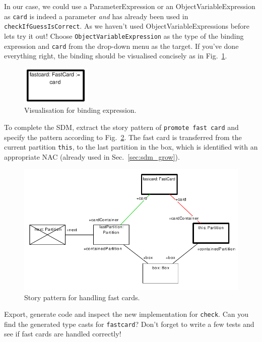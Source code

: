 In our case, we could use a ParameterExpression or an ObjectVariableExpression as
\texttt{card} is indeed a parameter \emph{and} has already been used in
\texttt{checkIfGuessIsCorrect}.  As we haven't used ObjectVariableExpressions
before lets try it out!  Choose \texttt{ObjectVariableExpression} as the type of
the binding expression and \texttt{card} from the drop-down menu as the target. 
If you've done everything right, the binding should be visualised concisely as
in Fig.~\ref{fig:sdm_fastcard_4}.
 
\begin{figure}[htbp]
\begin{center}
  \includegraphics[width=0.3\textwidth]{pics/sdmBilder/bindings/visual_bindingexp}
  \caption{Visualisation for binding expression.}  
  \label{fig:sdm_fastcard_4}
\end{center}
\end{figure}

To complete the SDM, extract the story pattern of \texttt{promote fast card} and
specify the pattern according to Fig.~\ref{fig:sdm_fastcard_5}.  The fast card
is transferred from the current partition \texttt{this}, to the last partition
in the box, which is identified with an appropriate \mbox{NAC} (already used in
Sec.~\ref{sec:sdm_grow}). 

\begin{figure}[htbp]
\begin{center}
  \includegraphics[width=\textwidth]{pics/sdmBilder/bindings/promoteFastCard}
  \caption{Story pattern for handling fast cards.}  
  \label{fig:sdm_fastcard_5}
\end{center}
\end{figure}

Export, generate code and inspect the new implementation for \texttt{check}. 
Can you find the generated type casts for \texttt{fastcard}?  Don't forget to
write a few tests and see if fast cards are handled correctly!


